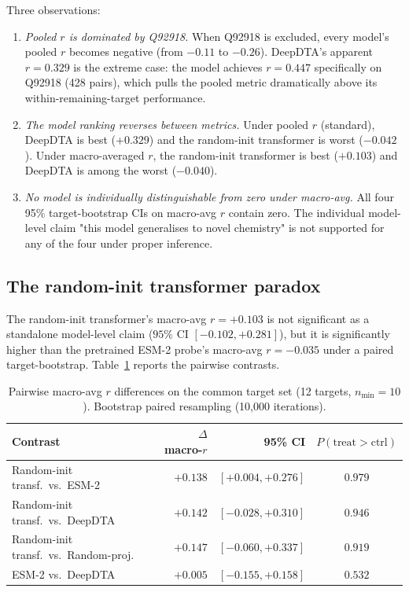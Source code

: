\documentclass[11pt,a4paper]{article}
\begin{document}
Three observations:
\begin{enumerate}
  \item \emph{Pooled $r$ is dominated by Q92918.} When Q92918 is excluded, every
    model's pooled $r$ becomes negative (from $-0.11$ to $-0.26$).
    DeepDTA's apparent $r = 0.329$ is the extreme case: the model achieves
    $r = 0.447$ specifically on Q92918 (428 pairs), which pulls the pooled
    metric dramatically above its within-remaining-target performance.
  \item \emph{The model ranking reverses between metrics.}
    Under pooled $r$ (standard), DeepDTA is best ($+0.329$) and the random-init
    transformer is worst ($-0.042$).
    Under macro-averaged $r$, the random-init transformer is best ($+0.103$) and
    DeepDTA is among the worst ($-0.040$).
  \item \emph{No model is individually distinguishable from zero under
    macro-avg.} All four 95\% target-bootstrap CIs on macro-avg $r$ contain zero.
    The individual model-level claim "this model generalises to novel chemistry"
    is not supported for any of the four under proper inference.
\end{enumerate}

\subsection{The random-init transformer paradox}
\label{sec:random-init}

The random-init transformer's macro-avg $r = +0.103$ is not significant as a
standalone model-level claim ($95\%$ CI $[-0.102, +0.281]$), but it is
significantly higher than the pretrained ESM-2 probe's macro-avg $r = -0.035$
under a paired target-bootstrap.
Table~\ref{tab:pairwise-delta} reports the pairwise contrasts.

\begin{table}[h]
\centering
\caption{Pairwise macro-avg $r$ differences on the common target set (12
targets, $n_\text{min} = 10$). Bootstrap paired resampling (10{,}000 iterations).}
\label{tab:pairwise-delta}
\begin{tabular}{lrrc}
\toprule
\textbf{Contrast} & \textbf{$\Delta$ macro-$r$} & \textbf{95\% CI} & \textbf{$P(\text{treat} > \text{ctrl})$} \\
\midrule
Random-init transf.\ vs.\ ESM-2    & $+0.138$ & $[+0.004, +0.276]$ & $\mathbf{0.979}$ \\
Random-init transf.\ vs.\ DeepDTA  & $+0.142$ & $[-0.028, +0.310]$ & $0.946$ \\
Random-init transf.\ vs.\ Random-proj.  & $+0.147$ & $[-0.060, +0.337]$ & $0.919$ \\
ESM-2 vs.\ DeepDTA                 & $+0.005$ & $[-0.155, +0.158]$ & $0.532$ \\
\bottomrule
\end{tabular}
\end{table}
\end{document}
